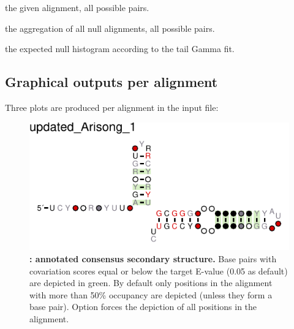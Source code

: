  \begin{sreitems}{}
 \item[\prog{First histogram}] the given alignment, all possible pairs.
 \item[\prog{Second histogram}] the aggregation of all null alignments, all possible pairs.
 \item[\prog{Third histogram}] the expected null histogram according to the tail Gamma fit.
 \end{sreitems}


 \subsection{Graphical outputs per alignment}
 Three plots are produced per alignment in the input file: 

 \begin{figure}
   \includegraphics[scale=1.5]{Arisong_R2R.pdf} 
 \caption{\small\textbf{:
     annotated consensus secondary structure.} Base pairs with
   covariation scores equal or below the target E-value (0.05 as
   default) are depicted in green. By default only positions in the
   alignment with more than 50\% occupancy are depicted (unless they form
   a base pair). Option  forces the depiction of all
   positions in the alignment.  }
 \label{fig:r2r}
 \end{figure}

